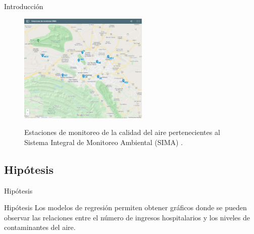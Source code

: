 \documentclass[11pt]{beamer}
\begin{document}
\begin{frame}{Introducción}
\begin{figure}[!h]
    \centering
	\includegraphics[trim=50 50 50 50,clip,width=0.55\textwidth]{mapa_estaciones}
	\label{fig:estaciones}
	\caption{Estaciones de monitoreo de la calidad del aire pertenecientes al Sistema Integral de Monitoreo Ambiental (SIMA) \cite{f2}.}
	\end{figure}
\end{frame}
\subsection{Hipótesis}
\begin{frame}{Hipótesis}
\begin{block}{Hipótesis} \justifying
Los modelos de regresión permiten obtener gráficos donde se pueden observar las relaciones entre el número de ingresos hospitalarios y los niveles de contaminantes del aire.
\end{block}
\end{frame}
\end{document}
